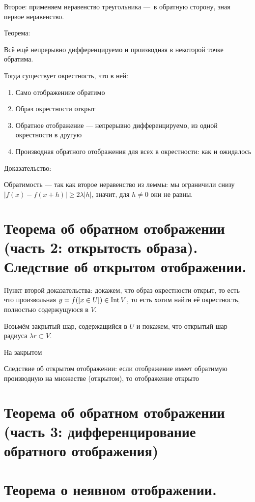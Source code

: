 \documentclass[12pt, a4paper]{article}
\begin{document}
    Второе: применяем неравенство треугольника — в обратную сторону, зная первое неравенство.
 
    \splitdoc

    Теорема:

    Всё ещё непрерывно дифференцируемо и производная в некоторой точке обратима.

    Тогда существует окрестность, что в ней:

    \begin{enumerate}
        \item Само отображениие обратимо
        \item Образ окрестности открыт
        \item Обратное отображение — непрерывно дифференцируемо, из одной окрестности в другую
        \item Производная обратного отображения для всех в окрестности: как и ожидалось
    \end{enumerate}

    Доказательство:

    Обратимость — так как второе неравенство из леммы: мы ограничили снизу $|f(x) - f(x + h)| \geqslant 2\lambda |h|$, значит, для $h \neq 0$ они не равны.



\section{Теорема об обратном отображении (часть 2: открытость образа). Следствие об открытом отображении.}

    Пункт второй доказательства: докажем, что образ окрестности открыт, 
    то есть что произвольная $y = f([x \in U]) \in \operatorname{Int} V$, то есть хотим найти её окрестность, полностью содержущуюся в $V$.

    Возьмём закрытый шар, содержащийся в $U$ и покажем, что открытый шар радиуса $\lambda r \subset V$.

    На закрытом 



    Следствие об открытом отображении: если отображение имеет обратимую производную на множестве (открытом), то отображение открыто

\section{Теорема об обратном отображении (часть 3: дифференцирование обратного отображения)}
\section{Теорема о неявном отображении.}
\end{document}
